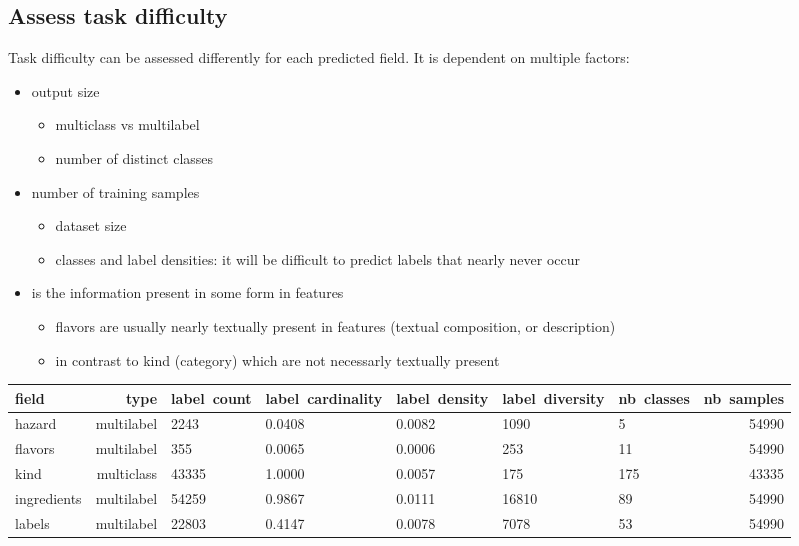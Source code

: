\subsection{Assess task difficulty}
Task difficulty can be assessed differently for each predicted field. It is dependent on multiple factors:
\begin{itemize}
	\item output size
	\begin{itemize}
		\item multiclass vs multilabel
		\item number of distinct classes
	\end{itemize}
	\item number of training samples
	\begin{itemize}
		\item dataset size
		\item classes and label densities: it will be difficult to predict labels that nearly never occur
	\end{itemize}
	\item is the information present in some form in features
	\begin{itemize}
		\item flavors are usually nearly textually present in features (textual composition, or description)
		\item in contrast to kind (category) which are not necessarly textually present
	\end{itemize}
\end{itemize}

\begin{tabularx}{\textwidth}{|l|r|X|X|X|X|X|r|}
\toprule
field & type &  label\ count & label\ cardinality &  label\ density &  label\ diversity &  nb\ classes &  nb\ samples \\
\midrule
hazard			      &          multilabel &    2243     &     0.0408 &         0.0082 &             1090 &           5 &       54990\\
flavors               &          multilabel &    355      &     0.0065 &         0.0006 &              253 &          11 &       54990 \\
kind                  &          multiclass &    43335    &     1.0000 &         0.0057 &              175 &         175 &       43335 \\
ingredients			  &          multilabel &    54259    &     0.9867 &         0.0111 &            16810 &          89 &       54990 \\
labels 		          &          multilabel &    22803    &     0.4147 &         0.0078 &             7078 &          53 &       54990 \\
\bottomrule
\end{tabularx}


